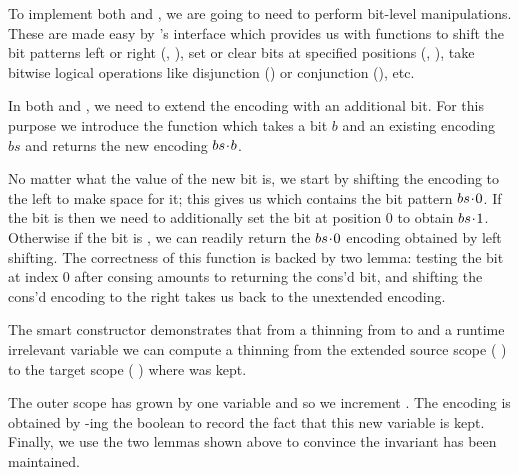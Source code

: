 
To implement both  and , we are going to need
to perform bit-level manipulations.
%
These are made easy by \idris{}'s  interface which provides us with
functions to
shift the bit patterns left or right (, ),
set or clear bits at specified positions (, ),
take bitwise logical operations like disjunction ()
or conjunction (), etc.


In both   and , we need to extend the
encoding with an additional bit.
%
For this purpose we introduce the  function which takes a bit
$b$ and an existing encoding $bs$ and returns the new encoding $bs\!\cdot{}\!b$.


No matter what the value of the new bit is, we start by shifting the encoding to
the left to make space for it; this gives us  which contains the
bit pattern $bs\!\cdot{}\!0$.
%
If the bit is  then we need to additionally set the bit at position
$0$ to obtain $bs\!\cdot{}\!1$. Otherwise if the bit is , we can readily
return the $bs\!\cdot{}\!0$ encoding obtained by left shifting.
%
The correctness of this function is backed by two lemma:
testing the bit at index $0$ after consing amounts to returning the cons'd bit,
and shifting the cons'd encoding to the right takes us back to the unextended
encoding.


The  smart constructor demonstrates that from a thinning from
 to  and a runtime irrelevant variable 
we can compute a thinning from the extended source scope
( \IdrisData{:<} ) to the target scope
( \IdrisData{:<} ) where  was kept.


The outer scope has grown by one variable and so we increment .
%
The encoding is obtained by -ing the boolean  to
record the fact that this new variable is kept.
%
Finally, we use the two lemmas shown above to convince \idris{} the invariant
has been maintained.

